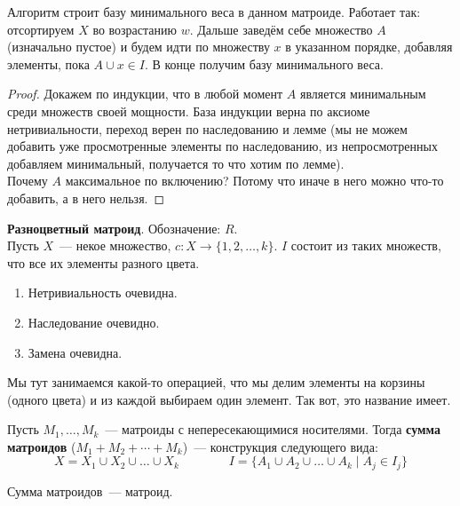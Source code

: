 \documentclass{article}
\begin{document}
    \begin{theorem}
        Алгоритм строит базу минимального веса в данном матроиде. Работает так: отсортируем $X$ во возрастанию $w$. Дальше заведём себе множество $A$ (изначально пустое) и будем идти по множеству $x$ в указанном порядке, добавляя элементы, пока $A\cup x\in I$. В конце получим базу минимального веса.
    \end{theorem}
    \begin{proof}
        Докажем по индукции, что в любой момент $A$ является минимальным среди множеств своей мощности. База индукции верна по аксиоме нетривиальности, переход верен по наследованию и лемме (мы не можем добавить уже просмотренные элементы по наследованию, из непросмотренных добавляем минимальный, получается то что хотим по лемме).\\
        Почему $A$ максимальное по включению? Потому что иначе в него можно что-то добавить, а в него нельзя.
    \end{proof}
    \begin{example}
        \textbf{Разноцветный матроид}. Обозначение: $R$.\\
        Пусть $X$~--- некое множество, $c\colon X\to\{1,2,\ldots,k\}$. $I$ состоит из таких множеств, что все их элементы разного цвета.
        \begin{enumerate}
            \item Нетривиальность очевидна.
            \item Наследование очевидно.
            \item Замена очевидна.
        \end{enumerate}
    \end{example}
    \begin{remark}
        Мы тут занимаемся какой-то операцией, что мы делим элементы на корзины (одного цвета) и из каждой выбираем один элемент. Так вот, это название имеет.
    \end{remark}
    \begin{definition}
        Пусть $M_1,\ldots,M_k$~--- матроиды с непересекающимися носителями. Тогда \textbf{сумма матроидов} ($M_1+M_2+\cdots+M_k$)~--- конструкция следующего вида:
        $$
        X=X_1\cup X_2\cup\ldots\cup X_k\qquad\qquad I=\{A_1\cup A_2\cup\ldots\cup A_k\mid A_j\in I_j\}
        $$
    \end{definition}
    \begin{theorem}
        Сумма матроидов~--- матроид.
    \end{theorem}
\end{document}
